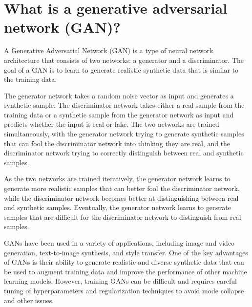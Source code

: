 \section{What is a generative adversarial network (GAN)?}
A Generative Adversarial Network (GAN) is a type of neural network architecture that consists of two networks: a generator and a discriminator. The goal of a GAN is to learn to generate realistic synthetic data that is similar to the training data.

The generator network takes a random noise vector as input and generates a synthetic sample. The discriminator network takes either a real sample from the training data or a synthetic sample from the generator network as input and predicts whether the input is real or fake. The two networks are trained simultaneously, with the generator network trying to generate synthetic samples that can fool the discriminator network into thinking they are real, and the discriminator network trying to correctly distinguish between real and synthetic samples.

As the two networks are trained iteratively, the generator network learns to generate more realistic samples that can better fool the discriminator network, while the discriminator network becomes better at distinguishing between real and synthetic samples. Eventually, the generator network learns to generate samples that are difficult for the discriminator network to distinguish from real samples.

GANs have been used in a variety of applications, including image and video generation, text-to-image synthesis, and style transfer. One of the key advantages of GANs is their ability to generate realistic and diverse synthetic data that can be used to augment training data and improve the performance of other machine learning models. However, training GANs can be difficult and requires careful tuning of hyperparameters and regularization techniques to avoid mode collapse and other issues.

